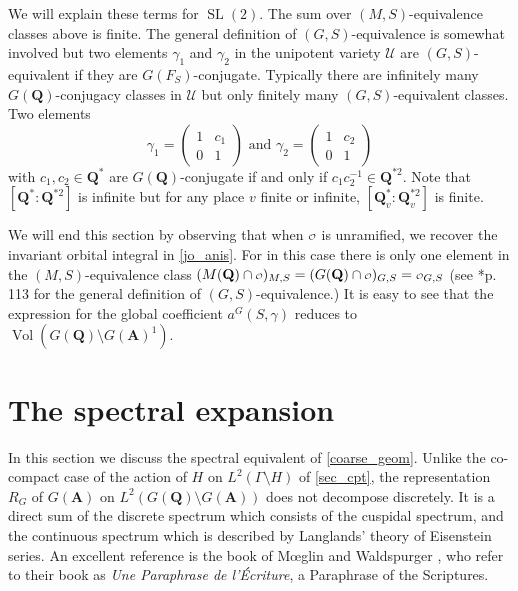 \documentclass[11pt]{amsart}
\def\A{\mathbf A}
\def\Q{\mathbf Q}
\def\o{\scalebox{0.8}{$\scriptstyle\mathcal{O}$}}
\def\UUU{\mathcal U}
\def\cb#1{{\color{black}#1}}
\def\bs{\setminus} 			%
\def\Ltwo{L^2}
\def\sl{\operatorname{SL}}
\def\vol{\operatorname{Vol}}
\theoremstyle{remark}
\begin{document}
\cb{
We will explain these terms for $\sl(2)$. The sum over $(M, S)$-equivalence classes above is finite. The general definition of $(G, S)$-equivalence is somewhat involved but two elements $\gamma_1$ and $\gamma_2$ in the unipotent variety $\UUU$ are $(G, S)$-equivalent if they are $G(F_S)$-conjugate. Typically there are infinitely many $G(\Q)$-conjugacy classes in $\UUU$ but only finitely many $(G, S)$-equivalent classes. Two elements
\[ \gamma_1 = \begin{pmatrix} 1 & c_1 \\ 0 & 1 \end{pmatrix} \text{ and } \gamma_2 = \begin{pmatrix} 1 & c_2 \\ 0 & 1 \end{pmatrix}
\]
with $c_1, c_2 \in \Q^*$ are $G(\Q)$-conjugate if and only if $c_1 c_2^{-1} \in \Q^{*2}$. Note that $[\Q^* : \Q^{*2}]$ is infinite but for any place $v$ finite or infinite, $[\Q_v^* : \Q_v^{*2}]$ is finite. }

\cb{
We will end this section by observing that when $\o$ is unramified, we recover the invariant orbital integral in \cref{jo_anis}. For in this case there is only one element in the $(M, S)$-equivalence class $(M(\Q)\cap \o)_{M, S} = (G(\Q)\cap \o)_{G, S} = \o_{G, S}$ (see \cite{clay}*{p. 113} for the general definition of $(G, S)$-equivalence.) It is easy to see that the expression for the global coefficient $a^G(S, \gamma)$ reduces to $\vol(G(\Q)\bs G(\A)^1)$. 
}


\section{The spectral expansion}

In this section we discuss the spectral equivalent of \cref{coarse_geom}. Unlike the co-compact case of the action of $H$ on $\Ltwo(\Gamma \bs H)$ of \cref{sec_cpt}, the representation $R_G$ of $G(\A)$ on $\Ltwo(G(\Q)\bs G(\A))$ does not decompose discretely. It is a direct sum of the discrete spectrum which consists of the cuspidal spectrum, and the continuous spectrum which is described by Langlands' theory of Eisenstein series. An excellent reference is the book of M{\oe}glin and Waldspurger \cite{MW}, who refer to their book as \textit{Une Paraphrase de l'\'{E}criture}, a Paraphrase of the Scriptures. 
\end{document}
